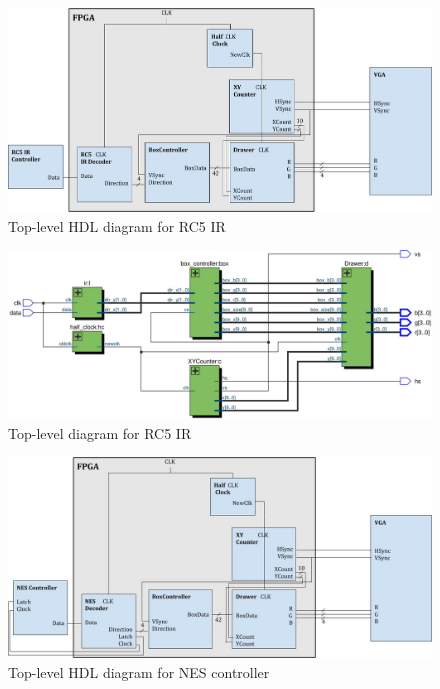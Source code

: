 \documentclass[12pt]{article}
\numberwithin{figure}{subsection}
\begin{document}
\begin{figure}
  \centering
  \includegraphics[width=\textwidth]{ir_hdl_top_level.jpg}
  \caption{Top-level HDL diagram for RC5 IR}
  \label{fig:ir_hdl_top_level}
\end{figure}

\begin{figure}
  \centering
  \includegraphics[width=\textwidth]{ir_top_level.jpg}
  \caption{Top-level diagram for RC5 IR}
  \label{fig:ir_top_level}
\end{figure}

\begin{figure}
  \centering
  \includegraphics[width=\textwidth]{nes_hdl_top_level.jpg}
  \caption{Top-level HDL diagram for NES controller}
  \label{fig:nes_hdl_top_level}
\end{figure}
\end{document}
